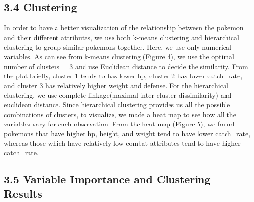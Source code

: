 \documentclass[
]{article}
\begin{document}
\hypertarget{clustering}{%
\subsection{3.4 Clustering}\label{clustering}}

In order to have a better visualization of the relationship between the
pokemon and their different attributes, we use both k-means clustering
and hierarchical clustering to group similar pokemons together. Here, we
use only numerical variables. As can see from k-means clustering (Figure
4), we use the optimal number of clusters = 3 and use Euclidean distance
to decide the similarity. From the plot briefly, cluster 1 tends to has
lower hp, cluster 2 has lower catch\_rate, and cluster 3 has relatively
higher weight and defense. \newline For the hierarchical clustering, we
use complete linkage(maximal inter-cluster dissimilarity) and euclidean
distance. Since hierarchical clustering provides us all the possible
combinations of clusters, to visualize, we made a heat map to see how
all the variables vary for each observation. From the heat map (Figure
5), we found pokemons that have higher hp, height, and weight tend to
have lower catch\_rate, whereas those which have relatively low combat
attributes tend to have higher catch\_rate.

\hypertarget{variable-importance-and-clustering-results}{%
\subsection{3.5 Variable Importance and Clustering
Results}\label{variable-importance-and-clustering-results}}
\end{document}
